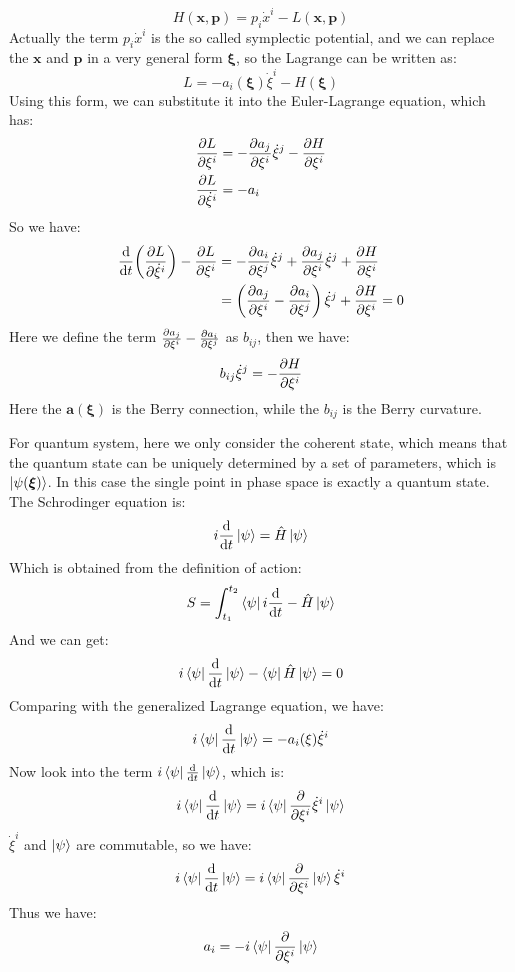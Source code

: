 \documentclass[../main.tex]{subfiles}
\begin{document}
\begin{equation}
  H(\bm{x}, \bm{p}) = p_i\dot{x}^i - L(\bm{x}, \bm{p})
\end{equation}
Actually the term $p_i\dot{x}^i$ is the so called symplectic potential, and we can replace the $\bm{x}$ and $\bm{p}$ 
in a very general form $\bm{\xi}$, so the Lagrange can be written as:
\begin{equation}
  L = -a_i(\bm{\xi})\dot{\xi}^i - H(\bm{\xi})
\end{equation}
Using this form, we can substitute it into the Euler-Lagrange equation, which has:
\begin{align}
  \pdv{L}{\xi^i} &= -\pdv{a_j}{\xi^i}\dot{\xi}^j - \pdv{H}{\xi^i}\\
  \pdv{L}{\dot{\xi}^i} &= -a_i 
\end{align}
So we have:
\begin{align}
  \dv{t}(\frac{\partial L}{\partial \dot{\xi}^i}) - \frac{\partial L}{\partial \xi^i} &= -\pdv{a_i}{\xi^j}\dot{\xi}^j + \pdv{a_j}{\xi^i}\dot{\xi}^j + \pdv{H}{\xi^i}\nonumber\\
  &= \left(\pdv{a_j}{\xi^i} - \pdv{a_i}{\xi^j}\right)\dot{\xi}^j + \pdv{H}{\xi^i} = 0
\end{align}
Here we define the term $\pdv{a_j}{\xi^i} - \pdv{a_i}{\xi^j}$ as $b_{ij}$, then we have:
\begin{equation}
  b_{ij}\dot{\xi}^j = -\pdv{H}{\xi^i}
\end{equation}
Here the $\bm{a}(\bm{\xi})$ is the Berry connection, while the $b_{ij}$ is the Berry curvature.

For quantum system, here we only consider the coherent state, which means that the quantum state can be uniquely
determined by a set of parameters, which is $\ket{\psi(\bm{\xi})}$. In this case the single point in phase space is
exactly a quantum state.
The Schrodinger equation is:
\begin{equation}
  i\dv{t}\ket{\psi} = \hat{H}\ket{\psi}
\end{equation}
Which is obtained from the definition of action:
\begin{equation}
  S = \int_{t_1}^{t_2} \bra{\psi} i\dv{t} - \hat{H} \ket{\psi}
\end{equation}
And we can get:
\begin{equation}
  i\bra{\psi}\dv{t}\ket{\psi} - \bra{\psi} \hat{H}\ket{\psi} = 0
\end{equation}
Comparing with the generalized Lagrange equation, we have:
\begin{equation}
  i\bra{\psi}\dv{t}\ket{\psi} = -a_i(\xi)\dot{\xi}^i
\end{equation}
Now look into the term $i\bra{\psi}\dv{t}\ket{\psi}$, which is:
\begin{equation}
  i\bra{\psi}\dv{t}\ket{\psi} = i\bra{\psi}\pdv{\xi^i}\dot{\xi}^i\ket{\psi}
\end{equation}
$\dot{\xi}^i$ and $\ket{\psi}$ are commutable, so we have:
\begin{equation}
  i\bra{\psi}\dv{t}\ket{\psi} = i\bra{\psi}\pdv{\xi^i}\ket{\psi}\dot{\xi}^i
\end{equation}
Thus we have:
\begin{equation}
  a_i = -i\bra{\psi}\pdv{\xi^i}\ket{\psi}
\end{equation}
\end{document}
